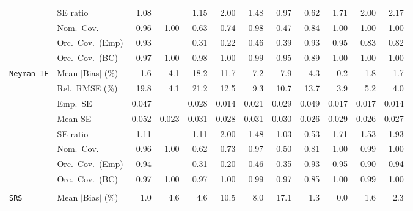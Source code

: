 \begin{landscape}
\begin{longtable}{llrrrrrrrrrr}
 & SE ratio & \cellcolor{ranktwo}1.08 &  & \cellcolor{rankthree}1.15 & 2.00 & 1.48 & \cellcolor{rankone}0.97 & 0.62 & 1.71 & 2.00 & 2.17 \\
 & Nom.\ Cov. & \cellcolor{rankone}0.96 & \cellcolor{rankthree}1.00 & 0.63 & 0.74 & \cellcolor{ranktwo}0.98 & 0.47 & 0.84 & \cellcolor{rankthree}1.00 & \cellcolor{rankthree}1.00 & \cellcolor{rankthree}1.00 \\
 & Orc.\ Cov.\ (Emp) & \cellcolor{ranktwo}0.93 &  & 0.31 & 0.22 & 0.46 & 0.39 & \cellcolor{ranktwo}0.93 & \cellcolor{rankone}0.95 & \cellcolor{rankthree}0.83 & 0.82 \\
 & Orc.\ Cov.\ (BC) & \cellcolor{ranktwo}0.97 & 1.00 & \cellcolor{rankthree}0.98 & 1.00 & 0.99 & \cellcolor{rankone}0.95 & 0.89 & 1.00 & 1.00 & 1.00 \\
\addlinespace[2pt]
\quad \texttt{Neyman-IF} & Mean $|$Bias$|$ (\%) & \cellcolor{ranktwo}1.6 & 4.1 & 18.2 & 11.7 & 7.2 & 7.9 & 4.3 & \cellcolor{rankone}0.2 & 1.8 & \cellcolor{rankthree}1.7 \\
 & Rel.\ RMSE (\%) & 19.8 & \cellcolor{rankthree}4.1 & 21.2 & 12.5 & 9.3 & 10.7 & 13.7 & \cellcolor{rankone}3.9 & 5.2 & \cellcolor{ranktwo}4.0 \\
 & Emp.\ SE & 0.047 &  & 0.028 & 0.014 & 0.021 & 0.029 & 0.049 & 0.017 & 0.017 & 0.014 \\
 & Mean SE & 0.052 & 0.023 & 0.031 & 0.028 & 0.031 & 0.030 & 0.026 & 0.029 & 0.026 & 0.027 \\
 & SE ratio & \cellcolor{ranktwo}1.11 &  & \cellcolor{ranktwo}1.11 & 2.00 & 1.48 & \cellcolor{rankone}1.03 & \cellcolor{rankthree}0.53 & 1.71 & 1.53 & 1.93 \\
 & Nom.\ Cov. & \cellcolor{rankone}0.96 & 1.00 & 0.62 & 0.73 & \cellcolor{ranktwo}0.97 & 0.50 & 0.81 & 1.00 & \cellcolor{rankthree}0.99 & 1.00 \\
 & Orc.\ Cov.\ (Emp) & \cellcolor{ranktwo}0.94 &  & 0.31 & 0.20 & 0.46 & 0.35 & \cellcolor{rankthree}0.93 & \cellcolor{rankone}0.95 & 0.90 & \cellcolor{ranktwo}0.94 \\
 & Orc.\ Cov.\ (BC) & \cellcolor{rankone}0.97 & \cellcolor{rankthree}1.00 & \cellcolor{rankone}0.97 & \cellcolor{rankthree}1.00 & \cellcolor{ranktwo}0.99 & \cellcolor{rankone}0.97 & 0.85 & \cellcolor{rankthree}1.00 & \cellcolor{ranktwo}0.99 & \cellcolor{rankthree}1.00 \\
\addlinespace[2pt]
\multicolumn{12}{l}{\textbf{Binary \& Categorical Phase-One Covariates}} \\
\addlinespace[2pt]
\quad \texttt{SRS} & Mean $|$Bias$|$ (\%) & \cellcolor{ranktwo}1.0 & 4.6 & 4.6 & 10.5 & 8.0 & 17.1 & \cellcolor{rankthree}1.3 & \cellcolor{rankone}0.0 & 1.6 & 2.3 \\

\end{longtable}
\end{landscape}
